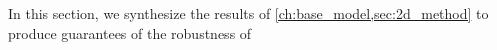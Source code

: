 In this section, we synthesize the results of \cref{ch:base_model,sec:2d_method} to produce guarantees of the robustness of 

